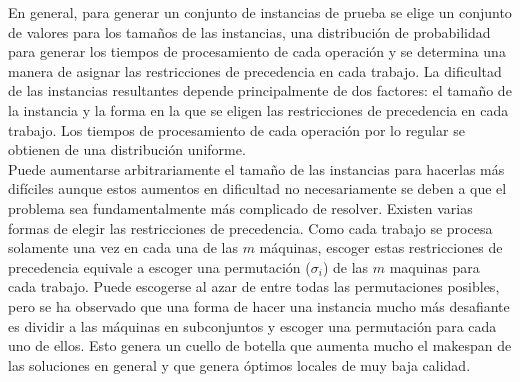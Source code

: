 %
En general, para generar un conjunto de instancias de prueba se elige un conjunto de valores para los tamaños de las instancias, una distribución de probabilidad para generar los tiempos de procesamiento de cada operación y se determina una manera de asignar las restricciones de precedencia en cada trabajo.
%
La dificultad de las instancias resultantes depende principalmente de dos factores: el tamaño de la instancia y la forma en la que se eligen las restricciones de precedencia en cada trabajo. Los tiempos de procesamiento de cada operación por lo regular se obtienen de una distribución uniforme.\\
%
Puede aumentarse arbitrariamente el tamaño de las instancias para hacerlas más difíciles aunque estos aumentos en dificultad no necesariamente se deben a que el problema sea fundamentalmente más complicado de resolver.
%
Existen varias formas de elegir las restricciones de precedencia. Como cada trabajo se procesa solamente una vez en cada una de las $m$ máquinas, escoger estas restricciones de precedencia equivale a escoger una permutación ($\sigma_i$) de las $m$ maquinas para cada trabajo. Puede escogerse al azar de entre todas las  permutaciones posibles, pero se ha observado que una forma de hacer una instancia mucho más desafiante es dividir a las máquinas en subconjuntos y escoger una permutación para cada uno de ellos. Esto genera un cuello de botella que aumenta mucho el makespan de las soluciones en general y que genera óptimos locales de muy baja calidad. \\

